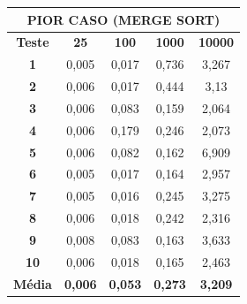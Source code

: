 \documentclass[a4paper, 12pt]{article}
\begin{document}
\begin{minipage}{1.0\textwidth}
  \begin{minipage}[c]{0.49\textwidth}
  \centering
\begin{tabular}{ccccc}

                       \multicolumn{ 5}{c}{{\bf PIOR CASO (MERGE SORT)}} \\
\hline
{\bf Teste} &   {\bf 25} &  {\bf 100} & {\bf 1000} & {\bf 10000} \\
\hline
   {\bf 1} &      0,005 &      0,017 &      0,736 &      3,267 \\
\hline
   {\bf 2} &      0,006 &      0,017 &      0,444 &       3,13 \\
\hline
   {\bf 3} &      0,006 &      0,083 &      0,159 &      2,064 \\
\hline
   {\bf 4} &      0,006 &      0,179 &      0,246 &      2,073 \\
\hline
   {\bf 5} &      0,006 &      0,082 &      0,162 &      6,909 \\
\hline
   {\bf 6} &      0,005 &      0,017 &      0,164 &      2,957 \\
\hline
   {\bf 7} &      0,005 &      0,016 &      0,245 &      3,275 \\
\hline
   {\bf 8} &      0,006 &      0,018 &      0,242 &      2,316 \\
\hline
   {\bf 9} &      0,008 &      0,083 &      0,163 &      3,633 \\
\hline
  {\bf 10} &      0,006 &      0,018 &      0,165 &      2,463 \\
\hline
{\bf Média} & {\bf 0,006} & {\bf 0,053} & {\bf 0,273} & {\bf 3,209} \\
\hline
\end{tabular}  
  \end{minipage}
 \hfill
 \begin{minipage}[c]{0.49\textwidth}
 \centering
{}\hfill

\end{minipage}
\end{minipage}
\end{document}
